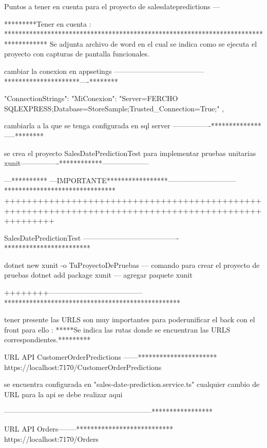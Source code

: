 Puntos a  tener en cuenta para el proyecto de salesdatepredictions   ---


*********Tener en cuenta :   ************************************************************************************
Se adjunta archivo de word en el cual se indica como se ejecuta el proyecto con capturas de pantalla funcionales.




cambiar la conexion en appsetings --------------------------------------*********************----********


 "ConnectionStrings": {
     "MiConexion": "Server=FERCHO\\SQLEXPRESS;Database=StoreSample;Trusted_Connection=True;"
 },
 
 cambiarla a la que se tenga configurada en sql server ----------------**************-----********
 
 se crea el proyecto SalesDatePredictionTest para implementar pruebas unitarias xunit----------------************--------------------
 
 
 ---********** ---IMPORTANTE*****************-----------------------------*******************************
 +++++++++++++++++++++++++++++++++++++++++++++++++++++++++++++++++++++++++++++++++++++++++++++++++++++
 
 
SalesDatePredictionTest ----------------------------------------************************


dotnet new xunit -o TuProyectoDePruebas  --- comando para crear el proyecto de pruebas 
dotnet add package xunit  --- agregar paquete xunit

 

 ++++++++---------------------------------------*************************************************
 
 
 tener presente las URLS son muy importantes para poderunificar el back con el front para ello :  
 *****Se indica las rutas donde se encuentran las URLS correspondientes.*********
 
 URL API CustomerOrderPredictions  ------**********************
 https://localhost:7170/CustomerOrderPredictions  
 
 se encuentra configurada en 
 "sales-date-prediction.service.ts" cualquier cambio de URL para la api se debe realizar aqui
 
 --------------------------------------------------------------*****************
 
 URL API Orders--------***************************
 https://localhost:7170/Orders
 
